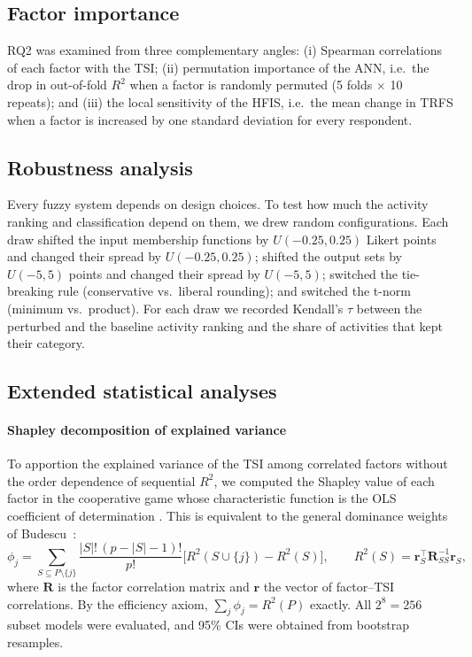 \documentclass[fleqn,10pt]{wlscirep}
\theoremstyle{remark}
\begin{document}
\subsection{Factor importance}
RQ2 was examined from three complementary angles: (i) Spearman correlations of each factor with the TSI; (ii) permutation importance of the ANN, i.e.\ the drop in out-of-fold $R^2$ when a factor is randomly permuted (5 folds $\times$ 10 repeats); and (iii) the local sensitivity of the HFIS, i.e.\ the mean change in TRFS when a factor is increased by one standard deviation for every respondent.

\subsection{Robustness analysis}
Every fuzzy system depends on design choices. To test how much the activity ranking and classification depend on them, we drew \RobDraws{} random configurations. Each draw shifted the input membership functions by $U(-0.25,0.25)$ Likert points and changed their spread by $U(-0.25,0.25)$; shifted the output sets by $U(-5,5)$ points and changed their spread by $U(-5,5)$; switched the tie-breaking rule (conservative vs.\ liberal rounding); and switched the t-norm (minimum vs.\ product). For each draw we recorded Kendall's $\tau$ between the perturbed and the baseline activity ranking and the share of activities that kept their category.

\subsection{Extended statistical analyses}
\label{sec:extended-methods}
\paragraph{Shapley decomposition of explained variance} To apportion the explained variance of the TSI among correlated factors without the order dependence of sequential $R^2$, we computed the Shapley value of each factor in the cooperative game whose characteristic function is the OLS coefficient of determination \cite{lipovetsky2001}. This is equivalent to the general dominance weights of Budescu~\cite{budescu1993}:
\begin{equation}
\phi_j=\sum_{S\subseteq P\setminus\{j\}}\frac{|S|!\,(p-|S|-1)!}{p!}\Big[R^2(S\cup\{j\})-R^2(S)\Big],\qquad R^2(S)=\mathbf{r}_S^{\top}\mathbf{R}_{SS}^{-1}\mathbf{r}_S,
\label{eq:shapley}
\end{equation}
where $\mathbf{R}$ is the factor correlation matrix and $\mathbf{r}$ the vector of factor--TSI correlations. By the efficiency axiom, $\sum_j\phi_j=R^2(P)$ exactly. All $2^8=256$ subset models were evaluated, and 95\% CIs were obtained from \ShapB{} bootstrap resamples.
\end{document}
